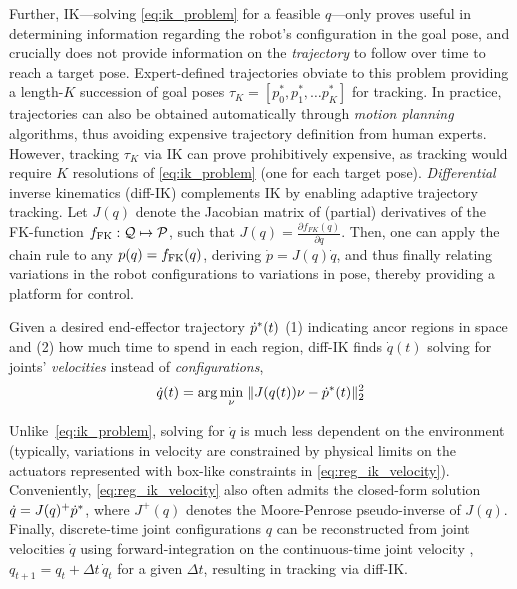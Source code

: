 Further, IK---solving \ref{eq:ik_problem} for a feasible \( q \)---only proves useful in determining information regarding the robot's configuration in the goal pose, and crucially does not provide information on the \emph{trajectory} to follow over time to reach a target pose.
Expert-defined trajectories obviate to this problem providing a length-\(K\) succession of goal poses \( \tau_K = [p^*_0, p^*_1, \dots p^*_K] \) for tracking.
In practice, trajectories can also be obtained automatically through \emph{motion planning} algorithms, thus avoiding expensive trajectory definition from human experts.
However, tracking \( \tau_K \) via IK can prove prohibitively expensive, as tracking would require \( K \) resolutions of \ref{eq:ik_problem} (one for each target pose).
\emph{Differential} inverse kinematics (diff-IK) complements IK by enabling adaptive trajectory tracking. 
Let \( J(q) \) denote the Jacobian matrix of (partial) derivatives of the FK-function \( f_{\text{FK}}: \mathcal Q \mapsto \mathcal P \), such that \( J(q) = \frac{\partial f_{FK}(q)}{\partial q } \).
Then, one can apply the chain rule to any \( p(q) = f_{\text{FK}}(q) \), deriving \( \dot p = J(q) \dot q \), and thus finally relating variations in the robot configurations to variations in pose, thereby providing a platform for control.

Given a desired end-effector trajectory \( \dot {p}^*(t) \) (1) indicating ancor regions in space  and (2) how much time to spend in each region, diff-IK finds \( \dot q(t) \) solving for joints' \emph{velocities} instead of \emph{configurations},
\begin{align}
\dot q(t) = \arg\min_\nu \; \lVert J(q(t)) \nu - \dot {p}^* (t) \rVert_2^2
\label{eq:reg_ik_velocity}
\end{align}

Unlike~\ref{eq:ik_problem}, solving for \( \dot q \) is much less dependent on the environment (typically, variations in velocity are constrained by physical limits on the actuators represented with box-like constraints in \ref{eq:reg_ik_velocity}).
Conveniently, \ref{eq:reg_ik_velocity} also often admits the closed-form solution \( \dot q = J(q)^+ \dot {p}^* \), where \( J^+(q) \) denotes the Moore-Penrose pseudo-inverse of \( J(q) \).
Finally, discrete-time joint configurations \( q \) can be reconstructed from joint velocities \( \dot q \) using forward-integration on the continuous-time joint velocity , \( q_{t+1} = q_t + \Delta t\,\dot q_t \) for a given \( \Delta t \), resulting in tracking via diff-IK.


